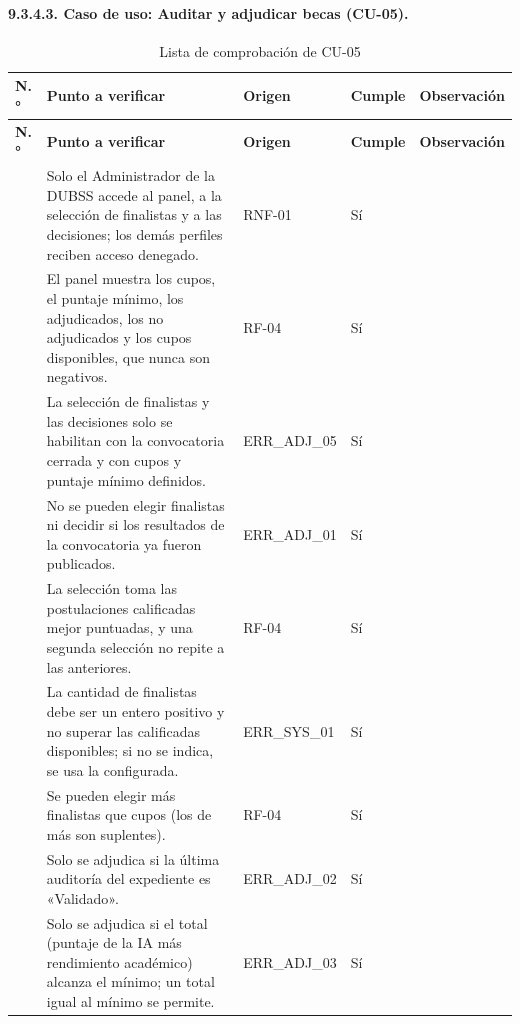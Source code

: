 \paragraph{9.3.4.3. Caso de uso: Auditar y adjudicar becas (CU-05).}

\begingroup\footnotesize
\begin{longtable}{@{}>{\raggedright\arraybackslash}p{0.7cm}>{\raggedright\arraybackslash}p{7.6cm}>{\raggedright\arraybackslash}p{2.0cm}>{\raggedright\arraybackslash}p{1.2cm}>{\raggedright\arraybackslash}p{2.3cm}@{}}
\caption{Lista de comprobación de CU-05}\label{tab:lc_cu05}\\
\toprule
\textbf{N.°} & \textbf{Punto a verificar} & \textbf{Origen} & \textbf{Cumple} & \textbf{Observación} \\
\midrule
\endfirsthead
\toprule
\textbf{N.°} & \textbf{Punto a verificar} & \textbf{Origen} & \textbf{Cumple} & \textbf{Observación} \\
\midrule
\endhead
\bottomrule
\endfoot
1 & Solo el Administrador de la DUBSS accede al panel, a la selección de finalistas y a las decisiones; los demás perfiles reciben acceso denegado. & RNF-01 & Sí & \\
2 & El panel muestra los cupos, el puntaje mínimo, los adjudicados, los no adjudicados y los cupos disponibles, que nunca son negativos. & RF-04 & Sí & \\
3 & La selección de finalistas y las decisiones solo se habilitan con la convocatoria cerrada y con cupos y puntaje mínimo definidos. & ERR\_ADJ\_05 & Sí & \\
4 & No se pueden elegir finalistas ni decidir si los resultados de la convocatoria ya fueron publicados. & ERR\_ADJ\_01 & Sí & \\
5 & La selección toma las postulaciones calificadas mejor puntuadas, y una segunda selección no repite a las anteriores. & RF-04 & Sí & \\
6 & La cantidad de finalistas debe ser un entero positivo y no superar las calificadas disponibles; si no se indica, se usa la configurada. & ERR\_SYS\_01 & Sí & \\
7 & Se pueden elegir más finalistas que cupos (los de más son suplentes). & RF-04 & Sí & \\
8 & Solo se adjudica si la última auditoría del expediente es «Validado». & ERR\_ADJ\_02 & Sí & \\
9 & Solo se adjudica si el total (puntaje de la IA más rendimiento académico) alcanza el mínimo; un total igual al mínimo se permite. & ERR\_ADJ\_03 & Sí & \\

\end{longtable}
